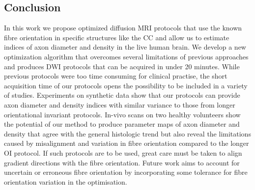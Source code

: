 \subsection*{Conclusion}
In this work we propose optimized diffusion MRI protocols that use the known fibre orientation in specific structures like the CC and allow us to estimate indices of axon diameter and density in the live human brain. We develop a new optimization algorithm that overcomes several limitations of previous approaches and produces DWI protocols that can be acquired in under 20 minutes. While previous protocols were too time consuming for clinical practise, the short acquisition time of our protocols opens the possibility to be included in a variety of studies. Experiments on synthetic data show that our protocols can provide axon diameter and density indices with similar variance to those from longer orientational invariant protocols. In-vivo scans on two healthy volunteers show the potential of our method to produce parameter maps of axon diameter and density that agree with the general histologic trend but also reveal the limitations caused by misalignment and variation in fibre orientation compared to the longer OI protocol. If such protocols are to be used, great care must be taken to align gradient directions with the fibre orientation. Future work aims to account for uncertain or erroneous fibre orientation by incorporating some tolerance for fibre orientation variation in the optimisation.